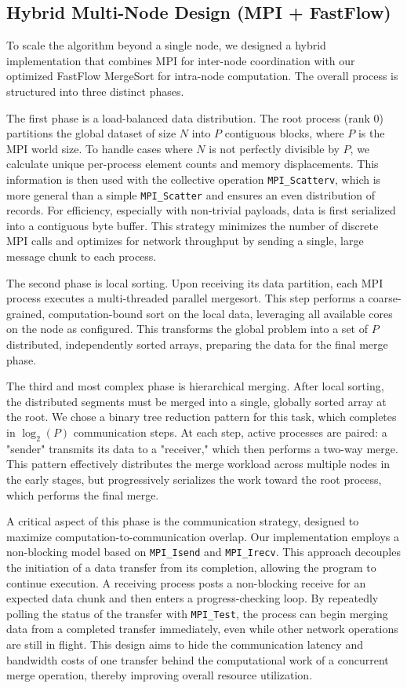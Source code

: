 \documentclass[10pt]{article}
\newcommand{\code}[1]{\texttt{#1}}
\begin{document}
\subsection{Hybrid Multi-Node Design (MPI + FastFlow)}
To scale the algorithm beyond a single node, we designed a hybrid implementation that combines MPI for inter-node coordination with our optimized FastFlow MergeSort for intra-node computation. The overall process is structured into three distinct phases.

The first phase is a load-balanced data distribution. The root process (rank 0) partitions the global dataset of size $N$ into $P$ contiguous blocks, where $P$ is the MPI world size. To handle cases where $N$ is not perfectly divisible by $P$, we calculate unique per-process element counts and memory displacements. This information is then used with the collective operation \code{MPI\_Scatterv}, which is more general than a simple \code{MPI\_Scatter} and ensures an even distribution of records. For efficiency, especially with non-trivial payloads, data is first serialized into a contiguous byte buffer. This strategy minimizes the number of discrete MPI calls and optimizes for network throughput by sending a single, large message chunk to each process.

The second phase is local sorting. Upon receiving its data partition, each MPI process executes a multi-threaded parallel mergesort. This step performs a coarse-grained, computation-bound sort on the local data, leveraging all available cores on the node as configured. This transforms the global problem into a set of $P$ distributed, independently sorted arrays, preparing the data for the final merge phase.

The third and most complex phase is hierarchical merging. After local sorting, the distributed segments must be merged into a single, globally sorted array at the root. We chose a binary tree reduction pattern for this task, which completes in $\log_2(P)$ communication steps. At each step, active processes are paired: a "sender" transmits its data to a "receiver," which then performs a two-way merge. This pattern effectively distributes the merge workload across multiple nodes in the early stages, but progressively serializes the work toward the root process, which performs the final merge.

A critical aspect of this phase is the communication strategy, designed to maximize computation-to-communication overlap. Our implementation employs a non-blocking model based on \code{MPI\_Isend} and \code{MPI\_Irecv}. This approach decouples the initiation of a data transfer from its completion, allowing the program to continue execution. A receiving process posts a non-blocking receive for an expected data chunk and then enters a progress-checking loop. By repeatedly polling the status of the transfer with \code{MPI\_Test}, the process can begin merging data from a completed transfer immediately, even while other network operations are still in flight. This design aims to hide the communication latency and bandwidth costs of one transfer behind the computational work of a concurrent merge operation, thereby improving overall resource utilization.
\end{document}
